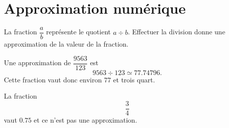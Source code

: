\section{Approximation numérique}

\begin{Aretenir}
    La fraction \( \dfrac{ a }{ b }\) représente le quotient \( a\div b\). Effectuer la division donne une approximation de la valeur de la fraction.
\end{Aretenir}

\begin{example}
    Une approximation de \( \dfrac{ 9563 }{ 123 }\) est
    \begin{equation}
     9563\div 123\simeq 77.74796.
    \end{equation}
    Cette fraction vaut donc environ \( 77\) et trois quart.
\end{example}

\begin{example}
    La fraction
    \begin{equation}
        \frac{ 3 }{ 4 }
    \end{equation}
    vaut \( 0.75\) et ce n'est pas une approximation.
\end{example}
